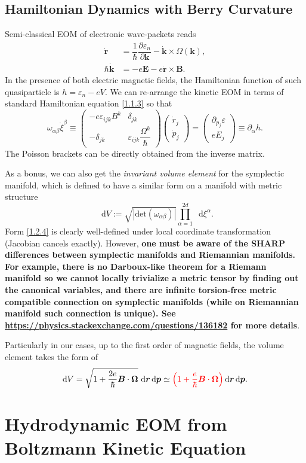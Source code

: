 \documentclass[10pt,nofootinbib,letterpaper]{revtex4}
\newcommand*\dd{\mathop{}\!\mathrm{d}}
\begin{document}
	\subsection{Hamiltonian Dynamics with Berry Curvature}
		Semi-classical EOM of electronic wave-packets reads
		\begin{align}
			\dot{\bm{r}}&=\dfrac{1}{\hbar}\dfrac{\partial \varepsilon_n}{\partial \bm{k}}-\dot{\bm{k}}\times\Omega(\bm{k}),\label{1.2.1}\\
			\hbar\dot{\bm{k}}&=-e\bm{E}-e\dot{\bm{r}}\times\bm{B}.\label{1.2.2}
		\end{align}
		In the presence of both electric magnetic fields, the Hamiltonian function of such quasiparticle is $h=\varepsilon_n-eV$. We can re-arrange the kinetic EOM in terms of standard Hamiltonian equation \eqref{1.1.3} so that
		\begin{equation}\label{1.2.3}
			\omega_{\alpha\beta}\dot{\xi}^\beta\equiv
			\left(\begin{array}{cc}
				-e \varepsilon_{ijk}B^k & \delta_{jk} \\
				-\delta_{jk} & \varepsilon_{ijk}\dfrac{\Omega^{k}}{\hbar}
			\end{array}\right)
			\left(\begin{array}{c}
				\dot{r}_j \\ \dot{p}_j
			\end{array}\right)=
			\left(\begin{array}{c}
				\partial_{p_j}\varepsilon \\ e E_j
			\end{array}\right)
			\equiv \partial_\alpha h.
		\end{equation}
		The Poisson brackets can be directly obtained from the inverse matrix.\par 
		As a bonus, we can also get the \emph{invariant volume element} for the symplectic manifold, which is defined to have a similar form on a manifold with metric structure
		\begin{equation}\label{1.2.4}
			\dd V:=\sqrt{|\mathrm{det}(\omega_{\alpha\beta})|}\prod_{\alpha=1}^{2d}\dd\xi^\alpha.
		\end{equation}
		Form \eqref{1.2.4} is clearly well-defined under local coordinate transformation (Jacobian cancels exactly). However, \textbf{one must be aware of the SHARP differences between symplectic manifolds and Riemannian manifolds. For example, there is no Darboux-like theorem for a Riemann manifold so we cannot locally trivialize a metric tensor by finding out the canonical variables, and there are infinite torsion-free metric compatible connection on symplectic manifolds (while on Riemannian manifold such connection is unique). See \url{https://physics.stackexchange.com/questions/136182} for more details}.\par
		Particularly in our cases, up to the first order of magnetic fields, the volume element takes the form of
		\begin{equation}\label{1.2.5}
			\dd V=\sqrt{1+\dfrac{2e}{\hbar}\bm{B}\cdot\bm{\Omega}}\,\dd\bm{r}\dd\bm{p}\simeq{\color{red}\left(1+\dfrac{e}{\hbar}\bm{B}\cdot\bm{\Omega}\right)}\dd\bm{r}\dd\bm{p}.
		\end{equation}

\section{Hydrodynamic EOM from Boltzmann Kinetic Equation}


\end{document}
